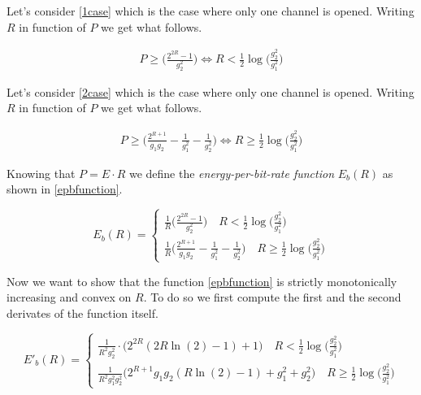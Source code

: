 Let's consider \eqref{1case} which is the case where only one channel is opened. Writing $R$ in function of $P$ we get what follows.

\begin{equation}
	\begin{gathered}
		P \geq \Big(\frac{2^{2R}-1}{g_2^2}\Big)
		\Leftrightarrow R < \frac{1}{2} \log\Big(\frac{g_2^2}{g_1^2}\Big)
	\end{gathered}
\end{equation}

Let's consider \eqref{2case} which is the case where only one channel is opened. Writing $R$ in function of $P$ we get what follows.

\begin{equation}
	\begin{gathered}
		P \geq \Big(\frac{2^{R+1}}{g_1g_2} -\frac{1}{g_1^2} - \frac{1}{g_2^2} \Big)
		\Leftrightarrow R \geq \frac{1}{2} \log\Big(\frac{g_2^2}{g_1^2}\Big)
	\end{gathered}
\end{equation}

Knowing that $P = E \cdot R$ we define the \textit{energy-per-bit-rate function} $E_b(R)$ as shown in \eqref{epbfunction}.

\begin{equation} E_b(R)=
	\begin{cases}
		\frac{1}{R}\Big(\frac{2^{2R}-1}{g_2^2}\Big) \quad R < \frac{1}{2} \log\Big(\frac{g_2^2}{g_1^2}\Big) \\
		\frac{1}{R} \Big(\frac{2^{R+1}}{g_1g_2} -\frac{1}{g_1^2} - \frac{1}{g_2^2} \Big) \quad R \geq \frac{1}{2} \log\Big(\frac{g_2^2}{g_1^2}\Big)
	\end{cases}
	\label{epbfunction}
\end{equation}

Now we want to show that the function \eqref{epbfunction} is strictly monotonically increasing and convex on $R$. To do so we first compute the first and the second derivates of the function itself.

\begin{equation}
	E'_b(R)= \begin{cases}
		\frac{1}{R^2g_2^2}\cdot \Big(2^{2R}(2R\ln(2)-1)+1\Big) \quad R < \frac{1}{2} \log\Big(\frac{g_2^2}{g_1^2}\Big) \\
		\frac{1}{R^2g_1^2 g_2^2} \Big(2^{R+1} g_1 g_2 ( R \ln(2)-1)+g_1^2+g_2^2 \Big) \quad R \geq \frac{1}{2} \log\Big(\frac{g_2^2}{g_1^2}\Big)
\end{cases}
\end{equation}

